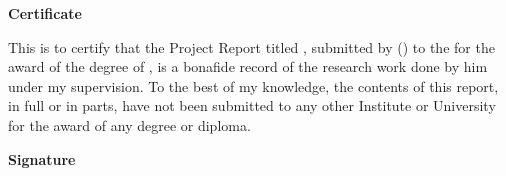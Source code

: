 \begin{flushright}
  \huge{\textbf{Certificate}}
\end{flushright}

\vspace{0.5cm}

This is to certify that the Project Report titled \ttitle{}, submitted by \authorname{} (\rn{}) to the \univname{} for the award of the degree of \degree{}, is a bonafide record of the research work done by him under my supervision. To the best of my knowledge, the contents of this report, in full or in parts, have not been submitted to any other Institute or University for the award of any degree or diploma.

\vspace{3cm}

\begin{flushright}
  \large{\textbf{Signature}}\\[0.5cm]
  \supname{}\\
  \suppost{}\\
  \supdeptname{}
\end{flushright}